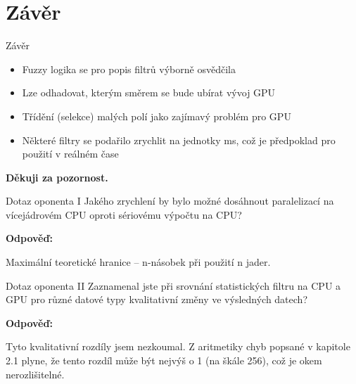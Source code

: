 \documentclass[compress,mathserif]{beamer}
\theoremstyle{definition}
\theoremstyle{plain}
\newcommand{\beI}{\begin{itemize}}
\newcommand{\enI}{\end{itemize}}
\begin{document}
\section{Závěr}
    \begin{frame}{Závěr}
      \beI
        \item Fuzzy logika se pro popis filtrů výborně osvědčila
        \item Lze odhadovat, kterým směrem se bude ubírat vývoj GPU
        \item Třídění (selekce) malých polí jako zajímavý problém pro GPU
        \item Některé filtry se podařilo zrychlit na jednotky ms, což je předpoklad pro použití v reálném čase
      \enI
    \end{frame}

     \begin{frame}
      \centering
     \textbf{Děkuji za pozornost.}
    \end{frame}

    \begin{frame}{Dotaz oponenta I}
      Jakého zrychlení by bylo možné dosáhnout paralelizací na vícejádrovém CPU oproti sériovému výpočtu na CPU?

        \vspace{20pt}
      \textbf{Odpověď:}

      Maximální teoretické hranice -- n-násobek při použití n jader.
    \end{frame}

    \begin{frame}{Dotaz oponenta II}
      Zaznamenal jste při srovnání statistických filtru na CPU a GPU pro různé datové
        typy kvalitativní změny ve výsledných datech?

        \vspace{20pt}
      \textbf{Odpověď:}

      Tyto kvalitativní rozdíly jsem nezkoumal. Z aritmetiky chyb popsané v kapitole 2.1 plyne,
      že tento rozdíl může být nejvýš o 1 (na škále 256), což je okem nerozlišitelné.
    \end{frame}
\end{document}
